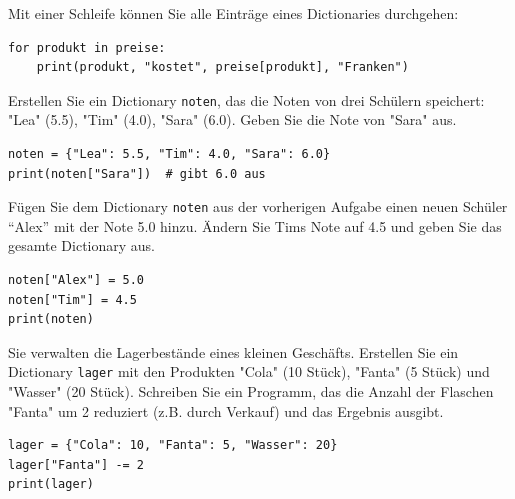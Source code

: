 \begin{myexample}
Mit einer Schleife können Sie alle Einträge eines Dictionaries durchgehen:
\begin{lstlisting}
for produkt in preise:
    print(produkt, "kostet", preise[produkt], "Franken")
\end{lstlisting}
\end{myexample}

\begin{myexercise}
Erstellen Sie ein Dictionary \lstinline|noten|, das die Noten von drei Schülern speichert: "Lea" (5.5), "Tim" (4.0), "Sara" (6.0). Geben Sie die Note von "Sara" aus.

\begin{myanswer}
\begin{lstlisting}
noten = {"Lea": 5.5, "Tim": 4.0, "Sara": 6.0}
print(noten["Sara"])  # gibt 6.0 aus
\end{lstlisting}
\end{myanswer}
\end{myexercise}

\begin{myexercise}
Fügen Sie dem Dictionary \lstinline|noten| aus der vorherigen Aufgabe einen neuen Schüler \enquote{Alex} mit der Note 5.0 hinzu. Ändern Sie Tims Note auf 4.5 und geben Sie das gesamte Dictionary aus.

\begin{myanswer}
\begin{lstlisting}
noten["Alex"] = 5.0
noten["Tim"] = 4.5
print(noten)
\end{lstlisting}
\end{myanswer}
\end{myexercise}

\begin{myexercise}
Sie verwalten die Lagerbestände eines kleinen Geschäfts. Erstellen Sie ein Dictionary \lstinline|lager| mit den Produkten "Cola" (10 Stück), "Fanta" (5 Stück) und "Wasser" (20 Stück). Schreiben Sie ein Programm, das die Anzahl der Flaschen "Fanta" um 2 reduziert (z.B. durch Verkauf) und das Ergebnis ausgibt.

\begin{myanswer}
\begin{lstlisting}
lager = {"Cola": 10, "Fanta": 5, "Wasser": 20}
lager["Fanta"] -= 2
print(lager)
\end{lstlisting}
\end{myanswer}
\end{myexercise}

